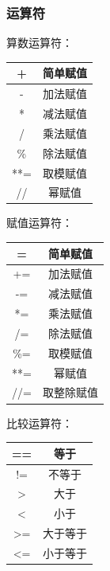 \documentclass[11pt]{beamer}
\begin{document}
\begin{frame}[fragile]
	\frametitle{运算符}
	\begin{minipage}[t]{0.33\linewidth}
		算数运算符：

		\begin{tabular}{|c|c|}
			\hline
			+   & 简单赋值 \\
			\hline
			-   & 加法赋值 \\
			\hline
			*   & 减法赋值 \\
			\hline
			/   & 乘法赋值 \\
			\hline
			\%  & 除法赋值 \\
			\hline
			**= & 取模赋值 \\
			\hline
			//  & 幂赋值   \\
			\hline
		\end{tabular}
	\end{minipage}%
	\begin{minipage}[t]{0.33\linewidth}
		赋值运算符：

		\begin{tabular}{|c|c|}
			\hline
			=   & 简单赋值   \\
			\hline
			+=  & 加法赋值   \\
			\hline
			-=  & 减法赋值   \\
			\hline
			*=  & 乘法赋值   \\
			\hline
			/=  & 除法赋值   \\
			\hline
			\%= & 取模赋值   \\
			\hline
			**= & 幂赋值     \\
			\hline
			//= & 取整除赋值 \\
			\hline
		\end{tabular}
	\end{minipage}%
	\begin{minipage}[t]{0.33\linewidth}
		比较运算符：

		\begin{tabular}{|c|c|}
			\hline
			== & 等于     \\
			\hline
			!= & 不等于   \\
			\hline
			>  & 大于     \\
			\hline
			<  & 小于     \\
			\hline
			>= & 大于等于 \\
			\hline
			<= & 小于等于 \\
			\hline
		\end{tabular}
	\end{minipage}
\end{frame}
\end{document}
